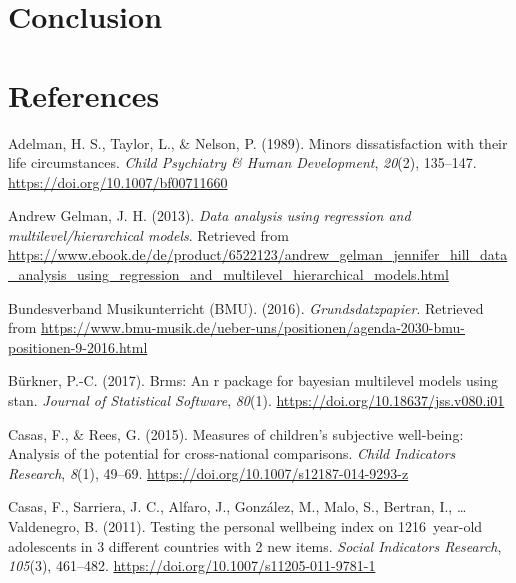 \documentclass[a4, 12pt]{article}
\begin{document}
\clearpage

\hypertarget{conclusion}{%
\section{Conclusion}\label{conclusion}}

\label{ch:conclusion}

\clearpage

\hypertarget{references}{%
\section*{References}\label{references}}

\singlespacing

\setlength{\parindent}{-0.5in}
\setlength{\leftskip}{0.5in}
\setlength{\parskip}{8pt}

\noindent

\hypertarget{refs}{}
\leavevmode\hypertarget{ref-Adelman1989}{}%
Adelman, H. S., Taylor, L., \& Nelson, P. (1989). Minors dissatisfaction with their life circumstances. \emph{Child Psychiatry \& Human Development}, \emph{20}(2), 135--147. \url{https://doi.org/10.1007/bf00711660}

\leavevmode\hypertarget{ref-AndrewGelman2013}{}%
Andrew Gelman, J. H. (2013). \emph{Data analysis using regression and multilevel/hierarchical models}. Retrieved from \url{https://www.ebook.de/de/product/6522123/andrew_gelman_jennifer_hill_data_analysis_using_regression_and_multilevel_hierarchical_models.html}

\leavevmode\hypertarget{ref-BundesverbandMusikunterricht}{}%
Bundesverband Musikunterricht (BMU). (2016). \emph{Grundsdatzpapier}. Retrieved from \url{https://www.bmu-musik.de/ueber-uns/positionen/agenda-2030-bmu-positionen-9-2016.html}

\leavevmode\hypertarget{ref-Buerkner2017}{}%
Bürkner, P.-C. (2017). Brms: An r package for bayesian multilevel models using stan. \emph{Journal of Statistical Software}, \emph{80}(1). \url{https://doi.org/10.18637/jss.v080.i01}

\leavevmode\hypertarget{ref-Casas2015}{}%
Casas, F., \& Rees, G. (2015). Measures of children's subjective well-being: Analysis of the potential for cross-national comparisons. \emph{Child Indicators Research}, \emph{8}(1), 49--69. \url{https://doi.org/10.1007/s12187-014-9293-z}

\leavevmode\hypertarget{ref-Casas2011}{}%
Casas, F., Sarriera, J. C., Alfaro, J., González, M., Malo, S., Bertran, I., \ldots{} Valdenegro, B. (2011). Testing the personal wellbeing index on 1216~year-old adolescents in 3 different countries with 2 new items. \emph{Social Indicators Research}, \emph{105}(3), 461--482. \url{https://doi.org/10.1007/s11205-011-9781-1}
\end{document}
